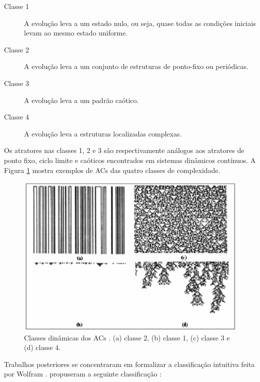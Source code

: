 \documentclass[12pt,a4paper]{article}
\begin{document}
\begin{description}
\item[Classe 1] A evolução leva a um estado nulo, ou seja, quase todas as condições
iniciais levam ao mesmo estado uniforme.
\item[Classe 2] A evolução leva a um conjunto de estruturas de ponto-fixo ou periódicas.
\item[Classe 3] A evolução leva a um padrão caótico.
\item[Classe 4] A evolução leva a estruturas localizadas complexas.
\end{description}

Os atratores nas classes 1, 2 e 3 são respectivamente análogos aos atratores
de ponto fixo, ciclo limite e caóticos encontrados em sistemas dinâmicos
contínuos. A Figura \ref{fig:classes} mostra exemplos de ACs
das quatro classes de complexidade.

\begin{figure}[htp]
\begin{center}
\includegraphics[scale=0.5]{img/classes.eps}
\caption{Classes dinâmicas dos ACs .
(a) classe 2, (b) classe 1, (c) classe 3 e (d) classe 4.}
\label{fig:classes}
\end{center}
\end{figure}

Trabalhos posteriores se concentraram em formalizar a classificação intuitiva
feita por Wolfram .  propuseram a seguinte
classificação :
\end{document}
